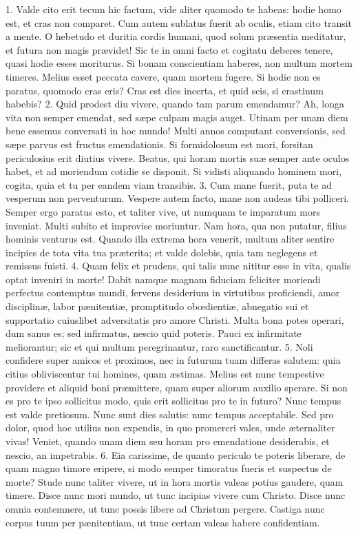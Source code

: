 1. Valde cito erit tecum hic factum, vide aliter quomodo te habeas: hodie homo est, et cras non comparet. Cum autem sublatus fuerit ab oculis, etiam cito transit a mente. O hebetudo et duritia cordis humani, quod solum præsentia meditatur, et futura non magis prævidet! Sic te in omni facto et cogitatu deberes tenere, quasi hodie esses moriturus. Si bonam conscientiam haberes, non multum mortem timeres. Melius esset peccata cavere, quam mortem fugere. Si hodie non es paratus, quomodo cras eris? Cras est dies incerta, et quid scis, si crastinum habebis?
2. Quid prodest diu vivere, quando tam parum emendamur? Ah, longa vita non semper emendat, sed sæpe culpam magis auget. Utinam per unam diem bene essemus conversati in hoc mundo! Multi annos computant conversionis, sed sæpe parvus est fructus emendationis. Si formidolosum est mori, forsitan periculosius erit diutius vivere. Beatus, qui horam mortis suæ semper ante oculos habet, et ad moriendum cotidie se disponit. Si vidisti aliquando hominem mori, cogita, quia et tu per eandem viam transibis.
3. Cum mane fuerit, puta te ad vesperum non perventurum. Vespere autem facto, mane non audeas tibi polliceri. Semper ergo paratus esto, et taliter vive, ut numquam te imparatum mors inveniat. Multi subito et improvise moriuntur. Nam hora, qua non putatur, filius hominis venturus est. Quando illa extrema hora venerit, multum aliter sentire incipies de tota vita tua præterita; et valde dolebis, quia tam neglegens et remissus fuisti.
4. Quam felix et prudens, qui talis nunc nititur esse in vita, qualis optat inveniri in morte! Dabit namque magnam fiduciam feliciter moriendi perfectus contemptus mundi, fervens desiderium in virtutibus proficiendi, amor disciplinæ, labor pænitentiæ, promptitudo obœdientiæ, abnegatio sui et supportatio cuiuslibet adversitatis pro amore Christi. Multa bona potes operari, dum sanus es; sed infirmatus, nescio quid poteris. Pauci ex infirmitate meliorantur; sic et qui multum peregrinantur, raro sanctificantur.
5. Noli confidere super amicos et proximos, nec in futurum tuam differas salutem: quia citius obliviscentur tui homines, quam æstimas. Melius est nunc tempestive providere et aliquid boni præmittere, quam super aliorum auxilio sperare. Si non es pro te ipso sollicitus modo, quis erit sollicitus pro te in futuro? Nunc tempus est valde pretiosum. Nunc sunt dies salutis: nunc tempus acceptabile. Sed pro dolor, quod hoc utilius non expendis, in quo promereri vales, unde æternaliter vivas! Veniet, quando unam diem seu horam pro emendatione desiderabis, et nescio, an impetrabis.
6. Eia carissime, de quanto periculo te poteris liberare, de quam magno timore eripere, si modo semper timoratus fueris et suspectus de morte? Stude nunc taliter vivere, ut in hora mortis valeas potius gaudere, quam timere. Disce nunc mori mundo, ut tunc incipias vivere cum Christo. Disce nunc omnia contemnere, ut tunc possis libere ad Christum pergere. Castiga nunc corpus tuum per pænitentiam, ut tunc certam valeas habere confidentiam.
